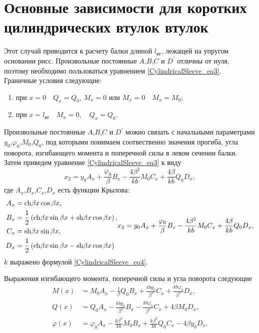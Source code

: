 \section{Основные зависимости для коротких цилиндрических втулок втулок}
\label{ShortConicalSleeve}

Этот случай приводится к расчету балки длиной $l_{\text{вт}}$, лежащей на упругом основании рисс. Произвольные постоянные $A$,$B$,$C$ и $D^{\prime}$ отличны от нуля, поэтому необходимо пользоваться уравнением \eqref{CylindricalSleeve_eq3}.
Граничные условия следующие: 
\begin{enumerate}
  \item при $x=0 \quad Q_x=Q_0$, $M_x=0$ или $M_x=0 \quad M_x=M_0$;
  \item при $x=l_{\text{вт}} \quad M_x=0, \quad Q_x=Q_0$.
  \end{enumerate}

Произвольные постоянные $A$,$B$,$C$ и $D^{\prime}$ можно связать с начальными параметрами $y_0$,${\varphi}_0$,$M_0$,$Q_0$, под которыми понимаем соотвественно значения прогиба, угла поворота, изгибающего момента и поперечной силы в левом сечении балки.
Затем приведем уравнение \eqref{CylindricalSleeve_eq3} к виду 
\begin{equation}
  \label{ShortConicalSleeve_eq1}
  x_2=y_0 A_x +\frac{{\varphi}_0}{\beta}B_x -\frac{4 {\beta}^2}{kb}M_0 C_x+ \frac{4 \beta}{kb}Q_0 D_x,  
\end{equation}
где $A_x$,$B_x$,$C_x$,$D_x$ есть функции Крылова:
\begin{equation}
  \label{ShortConicalSleeve_eq2}
  \begin{split}
    A_x&={\mathop{\rm ch}\nolimits}{\beta x} \cos{\beta x},\\
    B_x&=\frac{1}{2} \left( {\mathop{\rm ch}\nolimits}{\beta x}\sin{\beta x}+ {\mathop{\rm sh}\nolimits}{\beta x}\cos{\beta x}\right),\\
    C_x&={\mathop{\rm sh}\nolimits}{\beta x} \sin{\beta x},\\
    D_x&=\frac{1}{2} \left( {\mathop{\rm ch}\nolimits}{\beta x}\sin{\beta x}- {\mathop{\rm sh}\nolimits}{\beta x}\cos{\beta x}\right)
  \end{split}
  x_2=y_0 A_x +\frac{{\varphi}_0}{\beta}B_x -\frac{4 {\beta}^2}{kb}M_0 C_x+ \frac{4 \beta}{kb}Q_0 D_x,  
\end{equation}
$k$ выражено формулой \eqref{CylindricalSleeve_eq4}. 

Выражения изгибающего момента, поперечной силы и угла поворота следующие 
\begin{equation}
  \label{ShortConicalSleeve_eq3}
  \begin{split}
    M(x)&=M_0 A_x -\frac{1}{\beta}Q_0 B_x +\frac{kby_0}{{\beta}^2}C_x+\frac{kb{\varphi}_0}{{\beta}^3}D_x,\\
    Q(x)&=Q_0 A_x -\frac{kby_0}{{\beta}^2} B_x -\frac{kb{\varphi}_0}{{\beta}^3}C_x+4 \beta M_0 D_x,\\
    \varphi (x)&={\varphi}_0 A_x -\frac{k {\beta}^3 }{{kb}}M_0 B_x + \frac{k {\beta}^2 }{{kb}}Q_0 C_x - 4 \beta y_0 D_x.\\
  \end{split}
\end{equation}

